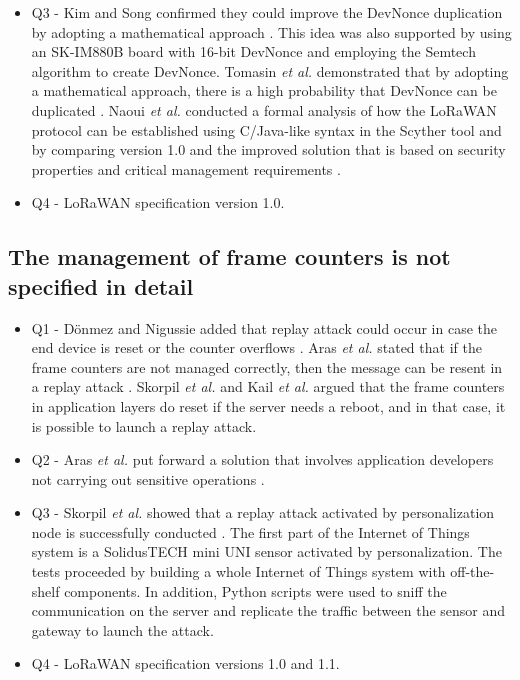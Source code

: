 \documentclass[manuscript,screen,review=false]{acmart}
\begin{document}
\begin{itemize}
\item Q3 - Kim and Song confirmed they could improve the DevNonce duplication by adopting a mathematical approach \cite{21_analysis_LoRaWAN_v1.1_security}. This idea was also supported by using an SK-IM880B board with 16-bit DevNonce and employing the Semtech algorithm to create DevNonce. Tomasin {\it et al.} demonstrated that by adopting a mathematical approach, there is a high probability that DevNonce can be duplicated \cite{34_lorawan_join_procedure}. Naoui {\it et al.} conducted a formal analysis of how the LoRaWAN protocol can be established using C/Java-like syntax in the Scyther tool and by comparing version 1.0 and the improved solution that is based on security properties and critical management requirements \cite{35_third_party_key_management}.

\item Q4 - LoRaWAN specification version 1.0.
\end{itemize}

\subsection{The management of frame counters is not specified in detail}

\begin{itemize}
\item Q1 - D\"onmez and Nigussie added that replay attack could occur in case the end device is reset or the counter overflows \cite{03_security_LoRaWANv1.1_scenarios}. Aras {\it et al.} stated that if the frame counters are not managed correctly, then the message can be resent in a replay attack \cite{32_security_vulnerabilities_LoRa}. Skorpil {\it et al.} \cite{59_IoT_security_overview_practical_demonstration} and Kail {\it et al.} \cite{77_security_survey} argued that the frame counters in application layers do reset if the server needs a reboot, and in that case, it is possible to launch a replay attack.

\item Q2 - Aras {\it et al.} put forward a solution that involves application developers not carrying out sensitive operations \cite{32_security_vulnerabilities_LoRa}.


\item Q3 - Skorpil {\it et al.} showed that a replay attack activated by personalization node is successfully conducted \cite{59_IoT_security_overview_practical_demonstration}. The first part of the Internet of Things system is a SolidusTECH mini UNI sensor activated by personalization. The tests proceeded by building a whole Internet of Things system with off-the-shelf components. In addition, Python scripts were used to sniff the communication on the server and replicate the traffic between the sensor and gateway to launch the attack.

\item Q4 - LoRaWAN specification versions 1.0 and 1.1.
\end{itemize}
\end{document}
